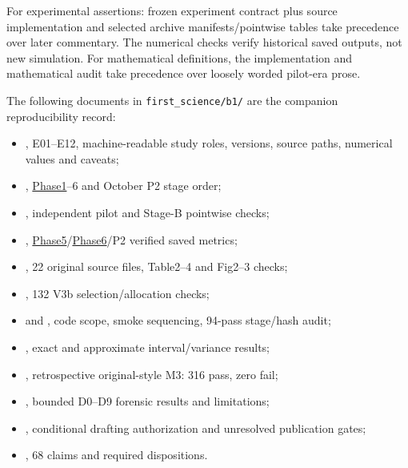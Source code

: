 \documentclass[10pt,a4paper]{article}
\begin{document}
For experimental assertions: frozen experiment contract plus source implementation and selected archive manifests/pointwise tables take precedence over later commentary. The numerical checks verify historical saved outputs, not new simulation. For mathematical definitions, the implementation and mathematical audit take precedence over loosely worded pilot-era prose.

The following documents in \texttt{first\_science/b1/} are the companion reproducibility record:

\begin{itemize}
\item {}, E01–E12, machine-readable study roles, versions, source paths, numerical values and caveats;
\item {}, \hyperref[app:experiment-stages]{Phase1}–6 and October P2 stage order;
\item {}, independent pilot and Stage-B pointwise checks;
\item {}, \hyperref[app:experiment-stages]{Phase5}/\hyperref[app:experiment-stages]{Phase6}/P2 verified saved metrics;
\item {}, 22 original source files, Table2–4 and Fig2–3 checks;
\item {}, 132 V3b selection/allocation checks;
\item {} and , code scope, smoke sequencing, 94-pass stage/hash audit;
\item {}, exact and approximate interval/variance results;
\item {}, retrospective original-style M3: 316 pass, zero fail;
\item {}, bounded D0--D9 forensic results and limitations;
\item {}, conditional drafting authorization and unresolved publication gates;
\item {}, 68 claims and required dispositions.
\end{itemize}
\end{document}
